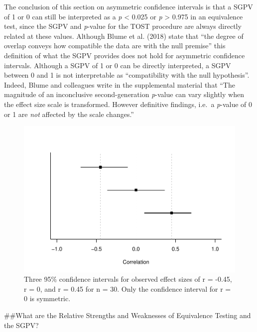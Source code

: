 \documentclass[,man,floatsintext]{apa6}
\begin{document}
The conclusion of this section on asymmetric confidence intervals is that a SGPV of 1 or 0 can still be interpreted as a \emph{p} \textless{} 0.025 or \emph{p} \textgreater{} 0.975 in an equivalence test, since the SGPV and \emph{p}-value for the TOST procedure are always directly related at these values. Although Blume et al. (2018) state that \enquote{the degree of overlap conveys how compatible the data are with the null premise} this definition of what the SGPV provides does not hold for asymmetric confidence intervals. Although a SGPV of 1 or 0 can be directly interpreted, a SGPV between 0 and 1 is not interpretable as \enquote{compatibility with the null hypothesis}. Indeed, Blume and colleagues write in the supplemental material that \enquote{The magnitude of an inconclusive second-generation \emph{p}-value can vary slightly when the effect size scale is transformed. However definitive findings, i.e.~a \emph{p}-value of 0 or 1 are \emph{not} affected by the scale changes.}

\begin{figure}
\centering
\includegraphics{manuscript_files/figure-latex/TOSTSGPV12-1.pdf}
\caption{\label{fig:TOSTSGPV12}Three 95\% confidence intervals for observed effect sizes of r = -0.45, r = 0, and r = 0.45 for n = 30. Only the confidence interval for r = 0 is symmetric.}
\end{figure}

\#\#What are the Relative Strengths and Weaknesses of Equivalence Testing and the SGPV?
\end{document}
